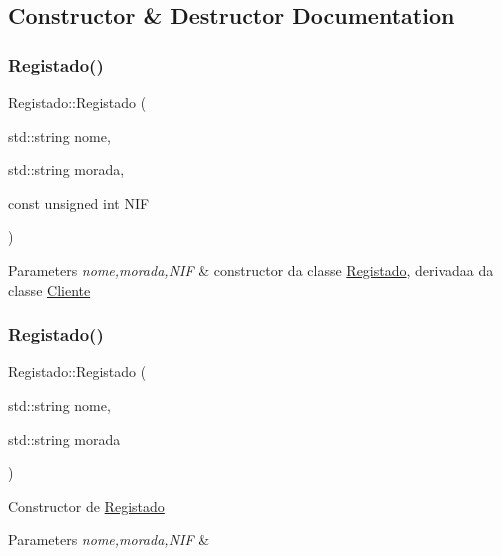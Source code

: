 \subsection{Constructor \& Destructor Documentation}
\mbox{\label{class_registado_ace8988ba72da772309e5aebf0bc82d4d}} 
\subsubsection{\texorpdfstring{Registado()}{Registado()}\hspace{0.1cm}{\footnotesize\ttfamily [1/3]}}
{\footnotesize\ttfamily Registado\+::\+Registado (\begin{DoxyParamCaption}\item[{std\+::string}]{nome,  }\item[{std\+::string}]{morada,  }\item[{const unsigned int}]{N\+IF }\end{DoxyParamCaption})}


\begin{DoxyParams}{Parameters}
{\em nome,morada,N\+IF} & constructor da classe \hyperlink{class_registado}{Registado}, derivadaa da classe \hyperlink{class_cliente}{Cliente} \\
\hline
\end{DoxyParams}
\mbox{\label{class_registado_a2ebad03ff43e207581c62952a88129b4}} 
\subsubsection{\texorpdfstring{Registado()}{Registado()}\hspace{0.1cm}{\footnotesize\ttfamily [2/3]}}
{\footnotesize\ttfamily Registado\+::\+Registado (\begin{DoxyParamCaption}\item[{std\+::string}]{nome,  }\item[{std\+::string}]{morada }\end{DoxyParamCaption})}

Constructor de \hyperlink{class_registado}{Registado} 
\begin{DoxyParams}{Parameters}
{\em nome,morada,N\+IF} & \\
\hline
\end{DoxyParams}
\mbox{\label{class_registado_a67a8d0c0dbd3103deae8813eb0958752}} 
